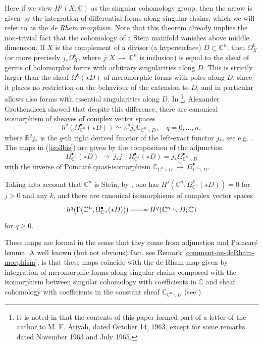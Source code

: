 \documentclass[12pt]{article}
\newcommand{\CC}{\mathbb{C}}
\newcommand{\RR}{\mathbb{R}}
\newcommand\bu{\bullet}
\newcommand\vsn{\vskip 10pt\noindent}
\newcommand\ssm{\smallsetminus}
\newcommand\beq{\begin{equation}}
\newcommand\eeq{\end{equation}}
\newcommand\G{{\Gamma}}
\newcommand\tos{{\ \rightarrow\ }}
\begin{document}
Here if we view $H^j(X;\CC)$ as the singular cohomology group, then the arrow is given by the integration of differential forms along
singular chains, which we will refer to as the {\it de Rham morphism}. Note that this theorem already implies the non-trivial fact that the cohomology of a Stein manifold vanishes above middle dimension.
\vsn
If $X$ is the complement of a divisor (a hypersurface) $D\subset\CC^n$, then ${\Omega}^k_X$ (or more precisely $j_*{\Omega}^k_X$, where $j:X\tos\CC^n$ is inclusion) is equal to the sheaf of germs of holomorphic forms with arbitrary singularities along $D$. This is strictly larger than the sheaf ${\Omega}^k(\star D)$ of meromorphic forms with poles along $D$, since it places no restriction on the behaviour of the extension to $D$, and in particular allows also forms with essential singularities along $D$.  In \cite[Th. 2]{GRO}\footnote{It is noted in \cite{GRO} that the contents of
this paper formed part of a letter of the author to M. F. Atiyah, dated October 14, 1963, except for some remarks dated November 1963 and July 1965.}, Alexander Grothendieck showed that despite this difference, there are canonical isomorphism of sheaves of complex vector spaces
 \beq\label{iso3bis}
 h^q \left({\Omega}^\bu_{\CC^n}(\star D)\right)\simeq \RR^q j_*\CC_{\CC^n\ssm D},\quad q=0,\dots, n,\eeq where $\RR^q j_*$ is the $q$-th right derived functor of the left-exact functor $j_*$, see e.g. \cite[I.7]{iversen-1986}.
The maps in (\ref{iso3bis}) are given by the composition of the adjunction $${\Omega}^\bu_{\CC^n}(\star D) \tos  j_* j^{-1} {\Omega}^\bu_{\CC^n}(\star D) = j_*{\Omega}^\bu_{\CC^n\ssm D}$$ with the inverse of Poincaré quasi-isomorphism $\CC_{\CC^n\ssm D} \stackrel{\sim}{\tos} {\Omega}^\bu_{\CC^n\ssm D}$.

Taking into account that $\CC^n$ is Stein, by \cite[Corollary, page 97]{GRO}, one has  $H^j(\CC^n,{\Omega}^k_{\CC^n}(\star D))= 0 $ for $j>0$ and any $k$, and there are canonical isomorphisms of complex vector spaces
\beq\label{iso2}\xymatrix {h^q(\G(\CC^n,{\Omega}^\bu_{\CC^n}(\star D)))\ar[r]& H^q(\CC^n\ssm D;\CC)} \eeq for $q\geq 0$.

These maps are formal in the sense that they come from adjunction and Poincaré lemma. A well known (but not obvious) fact, see Remark \ref{comment-on-deRham-morphism}, is that these maps coincide with the de Rham map given by integration of meromorphic forms along singular chains composed with the isomorphism between singular cohomology with coefficients in $\CC$ and sheaf cohomology with coefficients in the constant sheaf $\CC_{\CC^n\ssm D}$ (see \cite[Ch. 4; Th. 4.14]{Ramanan2005}).
\end{document}
